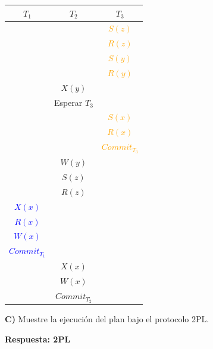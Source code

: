 \documentclass{templateNote}
\begin{document}
\begin{enumerate}
    \begin{center}
        \begin{tabular}{|c|c|c|}
            \hline
            \textbf{$T_1$} & \textbf{$T_2$} & \textbf{$T_3$} \\ \hline
            & & \textcolor{orange}{$S(z)$} \\
            & & \textcolor{orange}{$R(z)$} \\
            & & \textcolor{orange}{$S(y)$} \\
            & & \textcolor{orange}{$R(y)$} \\
            & \textcolor{green!80!black}{$X(y)$} & \\
            & \textcolor{green!80!black}{Esperar $T_3$} & \\
            & & \textcolor{orange}{$S(x)$} \\
            & & \textcolor{orange}{$R(x)$} \\
            & & \textcolor{orange}{$Commit_{T_{3}}$} \\
            & \textcolor{green!80!black}{$W(y)$} & \\
            & \textcolor{green!80!black}{$S(z)$} & \\
            & \textcolor{green!80!black}{$R(z)$} & \\
            \textcolor{blue}{$X(x)$} & & \\
            \textcolor{blue}{$R(x)$} & & \\
            \textcolor{blue}{$W(x)$} & & \\
            \textcolor{blue}{$Commit_{T_{1}}$} & & \\
            & \textcolor{green!80!black}{$X(x)$} & \\
            & \textcolor{green!80!black}{$W(x)$} & \\
            & \textcolor{green!80!black}{$Commit_{T_{2}}$} & \\ \hline
        \end{tabular}
    \end{center}

    \textbf{C)} Muestre la ejecución del plan bajo el protocolo 2PL.

    \textbf{Respuesta: 2PL}


\end{enumerate}
\end{document}
